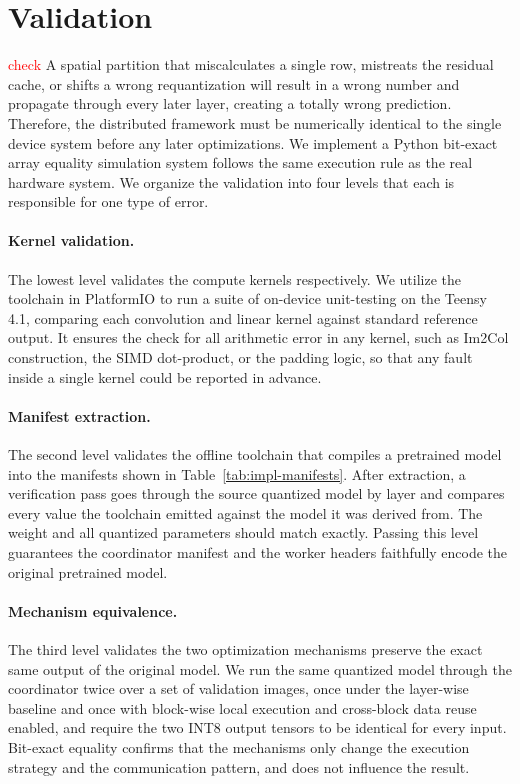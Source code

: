 \section{Validation}
\label{sec:implementation-validation}
\textcolor{red}{check}
A spatial partition that miscalculates a single row, mistreats the residual cache, or shifts a wrong requantization will result in a wrong number and propagate through every later layer, creating a totally wrong prediction. 
Therefore, the distributed framework must be numerically identical to the single device system before any later optimizations. 
We implement a Python bit-exact array equality simulation system follows the same execution rule as the real hardware system.
We organize the validation into four levels that each is responsible for one type of error.

\paragraph{Kernel validation.} 
The lowest level validates the compute kernels respectively. We utilize the toolchain in PlatformIO to run a suite of on-device unit-testing on the Teensy 4.1, comparing each convolution and linear kernel against standard reference output. 
It ensures the check for all arithmetic error in any kernel, such as Im2Col construction, the SIMD dot-product, or the padding logic, so that any fault inside a single kernel could be reported in advance.

\paragraph{Manifest extraction.} 
The second level validates the offline toolchain that compiles a pretrained model into the manifests shown in Table~\ref{tab:impl-manifests}. 
After extraction, a verification pass goes through the source quantized model by layer and compares every value the toolchain emitted against the model it was derived from. 
The weight and all quantized parameters should match exactly. Passing this level guarantees the coordinator manifest and the worker headers faithfully encode the original pretrained model.

\paragraph{Mechanism equivalence.} 
The third level validates the two optimization mechanisms preserve the exact same output of the original model. 
We run the same quantized model through the coordinator twice over a set of validation images, once under the layer-wise baseline and once with block-wise local execution and cross-block data reuse enabled, and require the two INT8 output tensors to be identical for every input. 
Bit-exact equality confirms that the mechanisms only change the execution strategy and the communication pattern, and does not influence the result.

